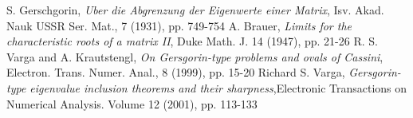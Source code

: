 \documentclass[12pt]{article}
\begin{document}
\begin{thebibliography}{6}
 S. Gerschgorin,
\emph{Uber die Abgrenzung der Eigenwerte einer Matrix}, Isv. Akad. Nauk USSR Ser. Mat., 7 (1931), pp. 749-754
 A. Brauer,
\emph{Limits for the characteristic roots of a matrix II}, Duke Math. J. 14 (1947), pp. 21-26
 R. S. Varga and A. Krautstengl, 
\emph{On Gersgorin-type problems and ovals of Cassini}, Electron. Trans. Numer. Anal., 8 (1999), pp. 15-20
 Richard S. Varga,
\emph{Gersgorin-type eigenvalue inclusion theorems and their sharpness},Electronic Transactions on Numerical Analysis.
Volume 12 (2001), pp. 113-133
\end{thebibliography}
\end{document}
